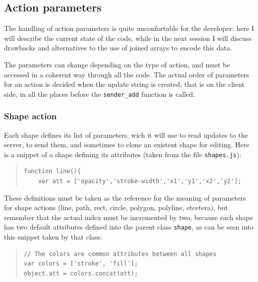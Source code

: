 \documentclass[10pt,a4paper,english]{book}
\begin{document}
\subsection{Action parameters}
\label{action-parameters}

The handling of action parameters is quite unconfortable for the
developer: here I will describe the current state of the code, while
in the next session I will discuss drawbacks and alternatives to the
use of joined arrays to encode this data.

The parameters can change depending on the type of action, and must be
accessed in a coherent way through all the code. The actual order of
parameters for an action is decided when the update string is created,
that is on the client side, in all the places before the
\texttt{sender{\_}add} function is called.



\hypertarget{shape-action}{}
\subsubsection{Shape action}
\label{shape-action}

Each shape defines its list of parameters, wich it will use to read
updates to the server, to send them, and sometimes to clone an
existent shape for editing. Here is a snippet of a shape defining its
attributes (taken from the file \texttt{shapes.js}):
\begin{quote}\begin{verbatim}
function line(){
    var att = ['opacity','stroke-width','x1','y1','x2','y2'];
\end{verbatim}
\end{quote}

These definitions must be taken as the reference for the meaning of
parameters for shape actions (line, path, rect, circle, polygon,
polyline, etcetera), but remember that the actual index must be
incremented by two, because each shape has two default attributes
defined into the parent class \texttt{shape}, as can be seen into this
snippet taken by that class:
\begin{quote}\begin{verbatim}
// The colors are common attributes between all shapes
var colors = ['stroke', 'fill'];
object.att = colors.concat(att);
\end{verbatim}
\end{quote}
\end{document}
